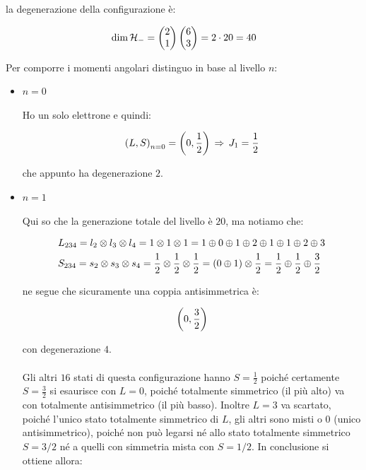 \begin{itemize}
\begin{enumerate}
			la degenerazione della configurazione è:
			
		\begin{align*}
			\text{dim} \, \mathcal{H}_- = \mqty(2 \\ 1) \, \mqty(6 \\ 3) = 2 \cdot 20 =  40
		\end{align*}

			Per comporre i momenti angolari distinguo in base al livello $n$:
			
		\begin{itemize}
			\item $n = 0$
			
				Ho un solo elettrone e quindi:
				
			\begin{align*}
				\qty(L, S)_{n = 0} = \qty(0, \frac{1}{2}) \, \Rightarrow \, J_1 = \frac{1}{2}
			\end{align*}
			
				che appunto ha degenerazione $2$.	
			
			\item $n = 1$
			
				Qui so che la generazione totale del livello è $20$, ma notiamo che:
			
			\begin{align*}
				& L_{234} = l_2 \otimes l_3 \otimes l_4 = 1 \otimes 1 \otimes 1 = 1 \oplus 0 \oplus 1 \oplus 2 \oplus 1 \oplus 1 \oplus 2 \oplus 3 \\
				& S_{234} = s_2 \otimes s_3 \otimes s_4 = \frac{1}{2} \otimes \frac{1}{2} \otimes \frac{1}{2} = \qty(0 \oplus 1) \otimes \frac{1}{2} = \frac{1}{2} \oplus \frac{1}{2} \oplus \frac{3}{2}
			\end{align*}
			
				ne segue che sicuramente una coppia antisimmetrica è:
				
			\begin{align*}
				\qty(0, \frac{3}{2})
			\end{align*}

				con degenerazione $4$. 
			\\
			\\
			Gli altri $16$ stati di questa configurazione hanno $S = \frac{1}{2}$ poiché certamente $S = \frac{3}{2}$ si esaurisce con $L = 0$, poiché totalmente simmetrico (il più alto) va con totalmente antisimmetrico (il più basso). Inoltre $L = 3$ va scartato, poiché l'unico stato totalmente simmetrico di $L$, gli altri sono misti o $0$ (unico antisimmetrico), poiché non può legarsi né allo stato totalmente simmetrico $S = 3/2$ né a quelli con simmetria mista con $S = 1/2$. In conclusione si ottiene allora:
			

\end{itemize}
\end{enumerate}
\end{itemize}
